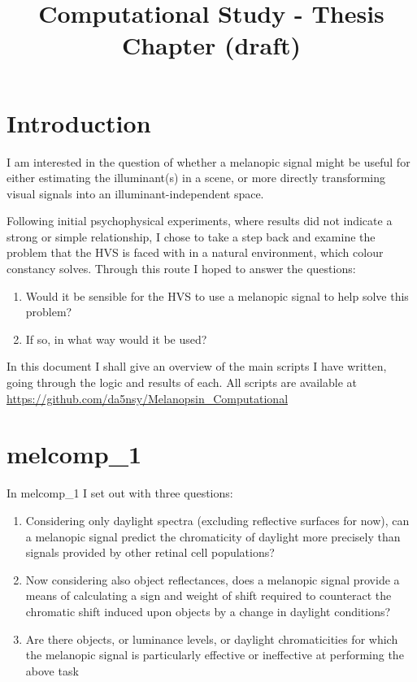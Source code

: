 \documentclass{article}
\title{Computational Study - Thesis Chapter (draft)}
\author{}
\date{}
\begin{document}
\maketitle
\sloppy

\section{Introduction}

I am interested in the question of whether a melanopic signal might be useful for either estimating the illuminant(s) in a scene, or more directly transforming visual signals into an illuminant-independent space.

Following initial psychophysical experiments, where results did not indicate a strong or simple relationship, I chose to take a step back and examine the problem that the HVS is faced with in a natural environment, which colour constancy solves. Through this route I hoped to answer the questions:
\begin{enumerate}
	\item Would it be sensible for the HVS to use a melanopic signal to help solve this problem?
	\item If so, in what way would it be used?
\end{enumerate}

In this document I shall give an overview of the main scripts I have written, going through the logic and results of each.
All scripts are available at \url{https://github.com/da5nsy/Melanopsin_Computational}

\section{melcomp\_1}

In melcomp\_1 I set out with three questions:
\begin{enumerate}
\item Considering only daylight spectra (excluding reflective surfaces for now), can a melanopic signal predict the chromaticity of daylight more precisely than signals provided by other retinal cell populations?
\item Now considering also object reflectances, does a melanopic signal provide a means of calculating a sign and weight of shift required to counteract the chromatic shift induced upon objects by a change in daylight conditions?
\item Are there objects, or luminance levels, or daylight chromaticities for which the melanopic signal is particularly effective or ineffective at performing the above task
\end{enumerate}
\end{document}
